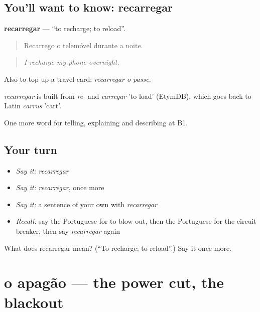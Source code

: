 \subsection*{You'll want to know: recarregar}
\textbf{recarregar} — \textquotedblleft{}to recharge; to reload\textquotedblright{}.

\begin{quote}
Recarrego o telemóvel durante a noite.
\end{quote}

\begin{quote}
\emph{I recharge my phone overnight.}
\end{quote}

Also to top up a travel card: \emph{recarregar o passe}.

\begin{cousinweb}
\emph{recarregar} is built from \emph{re-} and \emph{carregar} 'to load' (EtymDB), which goes back to Latin \emph{carrus} 'cart'.
\end{cousinweb}

\begin{grammarlens}[title={What you've built}]
One more word for telling, explaining and describing at B1.
\end{grammarlens}

\subsection*{Your turn}
\begin{itemize}
\raggedright
  \item \emph{Say it:} \emph{recarregar}
  \item \emph{Say it:} \emph{recarregar}, once more
  \item \emph{Say it:} a sentence of your own with \emph{recarregar}
  \item \emph{Recall:} say the Portuguese for to blow out, then the Portuguese for the circuit breaker, then say \emph{recarregar} again
\end{itemize}

\begin{tcolorbox}[breakable,colback=teal!4,colframe=teal!35!black,title={Before you move on}]
What does recarregar mean? (\textquotedblleft{}To recharge; to reload\textquotedblright{}.) Say it once more.
\end{tcolorbox}
\section[o apagão]{o apagão — the power cut, the blackout}

